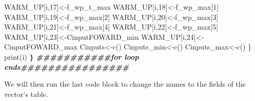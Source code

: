 \documentclass[
  10pt,
  b5paper,
]{book}
\newenvironment{Shaded}{\begin{snugshade}}{\end{snugshade}}
\newcommand{\DecValTok}[1]{\textcolor[rgb]{0.00,0.00,0.81}{#1}}
\newcommand{\DocumentationTok}[1]{\textcolor[rgb]{0.56,0.35,0.01}{\textbf{\textit{#1}}}}
\newcommand{\ErrorTok}[1]{\textcolor[rgb]{0.64,0.00,0.00}{\textbf{#1}}}
\newcommand{\FunctionTok}[1]{\textcolor[rgb]{0.00,0.00,0.00}{#1}}
\newcommand{\NormalTok}[1]{#1}
\newcommand{\OtherTok}[1]{\textcolor[rgb]{0.56,0.35,0.01}{#1}}
\begin{document}
\begin{Shaded}
\begin{Highlighting}[]
\NormalTok{WARM\_UP[i,}\DecValTok{17}\NormalTok{]}\OtherTok{\textless{}{-}}\NormalTok{f\_wp\_t\_max}
\NormalTok{WARM\_UP[i,}\DecValTok{18}\NormalTok{]}\OtherTok{\textless{}{-}}\NormalTok{f\_wp\_max[}\DecValTok{1}\NormalTok{]}
\NormalTok{WARM\_UP[i,}\DecValTok{19}\NormalTok{]}\OtherTok{\textless{}{-}}\NormalTok{f\_wp\_max[}\DecValTok{2}\NormalTok{]}
\NormalTok{WARM\_UP[i,}\DecValTok{20}\NormalTok{]}\OtherTok{\textless{}{-}}\NormalTok{f\_wp\_max[}\DecValTok{3}\NormalTok{]}
\NormalTok{WARM\_UP[i,}\DecValTok{21}\NormalTok{]}\OtherTok{\textless{}{-}}\NormalTok{f\_wp\_max[}\DecValTok{4}\NormalTok{]}
\NormalTok{WARM\_UP[i,}\DecValTok{22}\NormalTok{]}\OtherTok{\textless{}{-}}\NormalTok{f\_wp\_max[}\DecValTok{5}\NormalTok{]}
\NormalTok{WARM\_UP[i,}\DecValTok{23}\NormalTok{]}\OtherTok{\textless{}{-}}\NormalTok{CinputFOWARD\_min}
\NormalTok{WARM\_UP[i,}\DecValTok{24}\NormalTok{]}\OtherTok{\textless{}{-}}\NormalTok{CinputFOWARD\_max}
\NormalTok{Cinputs}\OtherTok{\textless{}{-}}\FunctionTok{c}\NormalTok{()}
\NormalTok{Cinputs\_min}\OtherTok{\textless{}{-}}\FunctionTok{c}\NormalTok{()}
\NormalTok{Cinputs\_max}\OtherTok{\textless{}{-}}\FunctionTok{c}\NormalTok{()}
\NormalTok{\}}
\FunctionTok{print}\NormalTok{(i)}
\ErrorTok{\}}
\DocumentationTok{\#\#\#\#\#\#\#\#\#\#\#for loop ends\#\#\#\#\#\#\#\#\#\#\#\#\#\#\#\#}
\end{Highlighting}
\end{Shaded}

We will then run the last code block to change the names to the fields of the vector's table.
\end{document}
